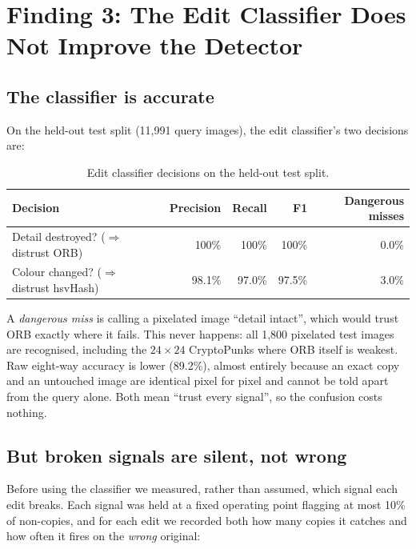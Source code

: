 \section{Finding 3: The Edit Classifier Does Not Improve the Detector}
\label{sec:classifier}

\subsection{The classifier is accurate}

On the held-out test split (11,991 query images), the edit classifier's two decisions are:

\begin{table}[ht]
\centering
\begin{tabular}{@{}lrrrr@{}}
\toprule
Decision & Precision & Recall & F1 & Dangerous misses \\
\midrule
Detail destroyed? ($\Rightarrow$ distrust ORB)      & 100\%  & 100\%  & 100\%  & 0.0\% \\
Colour changed? ($\Rightarrow$ distrust hsvHash)    & 98.1\% & 97.0\% & 97.5\% & 3.0\% \\
\bottomrule
\end{tabular}
\caption{Edit classifier decisions on the held-out test split.}
\label{tab:classifier}
\end{table}

A \emph{dangerous miss} is calling a pixelated image ``detail intact'', which would trust ORB
exactly where it fails. This never happens: all 1,800 pixelated test images are recognised,
including the $24\times24$ CryptoPunks where ORB itself is weakest. Raw eight-way accuracy is
lower (89.2\%), almost entirely because an exact copy and an untouched image are identical
pixel for pixel and cannot be told apart from the query alone. Both mean ``trust every
signal'', so the confusion costs nothing.

\subsection{But broken signals are silent, not wrong}

Before using the classifier we measured, rather than assumed, which signal each edit breaks.
Each signal was held at a fixed operating point flagging at most 10\% of non-copies, and for
each edit we recorded both how many copies it catches and how often it fires on the
\emph{wrong} original:

